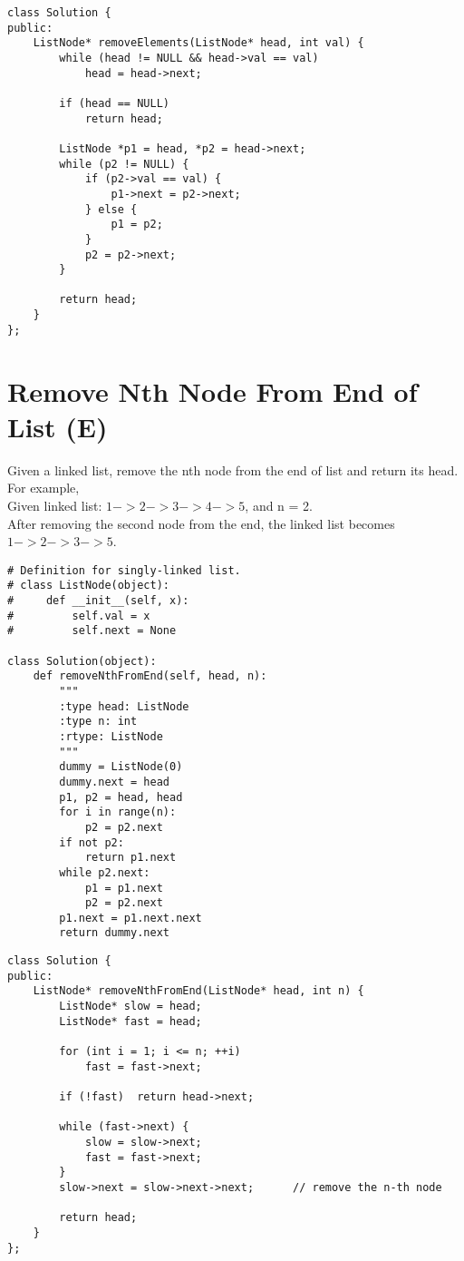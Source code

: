 \begin{lstlisting}
class Solution {
public:
    ListNode* removeElements(ListNode* head, int val) {
        while (head != NULL && head->val == val)
            head = head->next;
            
        if (head == NULL)
            return head;
        
        ListNode *p1 = head, *p2 = head->next;
        while (p2 != NULL) {
            if (p2->val == val) {
                p1->next = p2->next;
            } else {
                p1 = p2;
            }
            p2 = p2->next;
        }
        
        return head;
    }
};
\end{lstlisting}


\section{Remove Nth Node From End of List (E)}
Given a linked list, remove the nth node from the end of list and return its head.\\

For example,\\
   Given linked list: $1->2->3->4->5$, and n = 2.\\
   After removing the second node from the end, the linked list becomes $1->2->3->5$.\\

\begin{lstlisting}
# Definition for singly-linked list.
# class ListNode(object):
#     def __init__(self, x):
#         self.val = x
#         self.next = None

class Solution(object):
    def removeNthFromEnd(self, head, n):
        """
        :type head: ListNode
        :type n: int
        :rtype: ListNode
        """
        dummy = ListNode(0)
        dummy.next = head
        p1, p2 = head, head
        for i in range(n):
            p2 = p2.next
        if not p2: 
            return p1.next
        while p2.next:
            p1 = p1.next
            p2 = p2.next
        p1.next = p1.next.next
        return dummy.next
\end{lstlisting}        

\begin{lstlisting}
class Solution {
public:
    ListNode* removeNthFromEnd(ListNode* head, int n) {
        ListNode* slow = head;
        ListNode* fast = head;
        
        for (int i = 1; i <= n; ++i)
            fast = fast->next;
            
        if (!fast)  return head->next;
        
        while (fast->next) {
            slow = slow->next;
            fast = fast->next;
        }
        slow->next = slow->next->next;      // remove the n-th node
        
        return head;
    }
};
\end{lstlisting}


